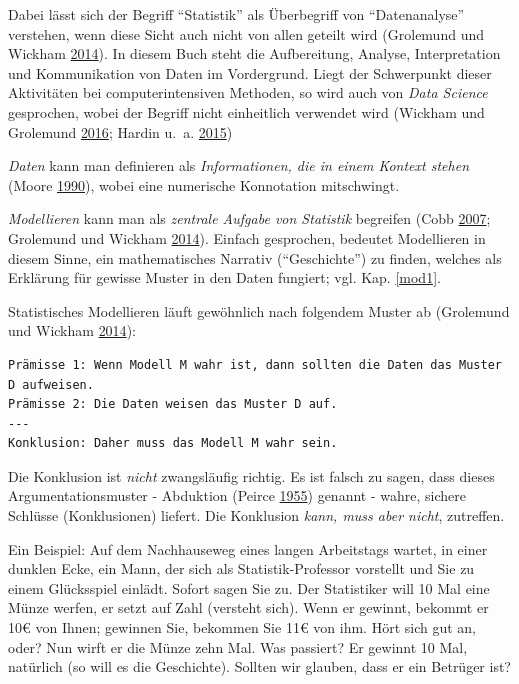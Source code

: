 \documentclass[12pt,ngerman,]{book}
\newcommand{\euro}{€}
\theoremstyle{definition}
\theoremstyle{definition}
\theoremstyle{remark}
\begin{document}
Dabei lässt sich der Begriff ``Statistik'' als Überbegriff von
``Datenanalyse'' verstehen, wenn diese Sicht auch nicht von allen
geteilt wird (Grolemund und Wickham
\protect\hyperlink{ref-grolemund2014cognitive}{2014}). In diesem Buch
steht die Aufbereitung, Analyse, Interpretation und Kommunikation von
Daten im Vordergrund. Liegt der Schwerpunkt dieser Aktivitäten bei
computerintensiven Methoden, so wird auch von \emph{Data Science}
gesprochen, wobei der Begriff nicht einheitlich verwendet wird (Wickham
und Grolemund \protect\hyperlink{ref-r4ds}{2016}; Hardin u.~a.
\protect\hyperlink{ref-hardin2015data}{2015})

\emph{Daten} kann man definieren als \emph{Informationen, die in einem
Kontext stehen} (Moore
\protect\hyperlink{ref-moore1990uncertainty}{1990}), wobei eine
numerische Konnotation mitschwingt.

\emph{Modellieren} kann man als \emph{zentrale Aufgabe von Statistik}
begreifen (Cobb \protect\hyperlink{ref-cobb2007introductory}{2007};
Grolemund und Wickham
\protect\hyperlink{ref-grolemund2014cognitive}{2014}). Einfach
gesprochen, bedeutet Modellieren in diesem Sinne, ein mathematisches
Narrativ (``Geschichte'') zu finden, welches als Erklärung für gewisse
Muster in den Daten fungiert; vgl. Kap. \ref{mod1}.

Statistisches Modellieren läuft gewöhnlich nach folgendem Muster ab
(Grolemund und Wickham
\protect\hyperlink{ref-grolemund2014cognitive}{2014}):

\begin{verbatim}
Prämisse 1: Wenn Modell M wahr ist, dann sollten die Daten das Muster D aufweisen.
Prämisse 2: Die Daten weisen das Muster D auf.
---
Konklusion: Daher muss das Modell M wahr sein.
\end{verbatim}

Die Konklusion ist \emph{nicht} zwangsläufig richtig. Es ist falsch zu
sagen, dass dieses Argumentationsmuster - Abduktion (Peirce
\protect\hyperlink{ref-peirce1955abduction}{1955}) genannt - wahre,
sichere Schlüsse (Konklusionen) liefert. Die Konklusion \emph{kann, muss
aber nicht}, zutreffen.

Ein Beispiel: Auf dem Nachhauseweg eines langen Arbeitstags wartet, in
einer dunklen Ecke, ein Mann, der sich als Statistik-Professor vorstellt
und Sie zu einem Glücksspiel einlädt. Sofort sagen Sie zu. Der
Statistiker will 10 Mal eine Münze werfen, er setzt auf Zahl (versteht
sich). Wenn er gewinnt, bekommt er 10\euro{} von Ihnen; gewinnen Sie,
bekommen Sie 11\euro{} von ihm. Hört sich gut an, oder? Nun wirft er die
Münze zehn Mal. Was passiert? Er gewinnt 10 Mal, natürlich (so will es
die Geschichte). Sollten wir glauben, dass er ein Betrüger ist?
\end{document}
